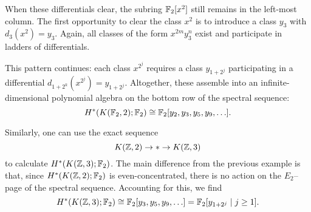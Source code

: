 \begin{example}
When these differentials clear, the subring $\mathbb F_2[x^2]$ still remains in the left-most column.
The first opportunity to clear the class $x^2$ is to introduce a class $y_3$ with $d_3(x^2) = y_3$.
Again, all classes of the form $x^{2m} y_3^n$ exist and participate in ladders of differentials.

This pattern continues: each class $x^{2^j}$ requires a class $y_{1+2^j}$ participating in a differential $d_{1+2^k}(x^{2^j}) = y_{1+2^j}$.
Altogether, these assemble into an infinite-dimensional polynomial algebra on the bottom row of the spectral sequence: \[H^*(K(\mathbb F_2, 2); \mathbb F_2) \cong \mathbb F_2[y_2, y_3, y_5, y_9, \ldots].\]
\end{example}

\begin{example}
Similarly, one can use the exact sequence \[K(\mathbb Z, 2) \to * \to K(\mathbb Z, 3)\] to calculate $H^*(K(\mathbb Z, 3); \mathbb F_2)$.
The main difference from the previous example is that, since $H^*(K(\mathbb Z, 2); \mathbb F_2)$ is even-concentrated, there is no action on the $E_2$--page of the spectral sequence.
Accounting for this, we find \[H^*(K(\mathbb Z, 3); \mathbb F_2) \cong \mathbb F_2[y_3, y_5, y_9, \ldots] = \mathbb F_2[y_{1+2^j} \mid j \ge 1].\]
\end{example}

